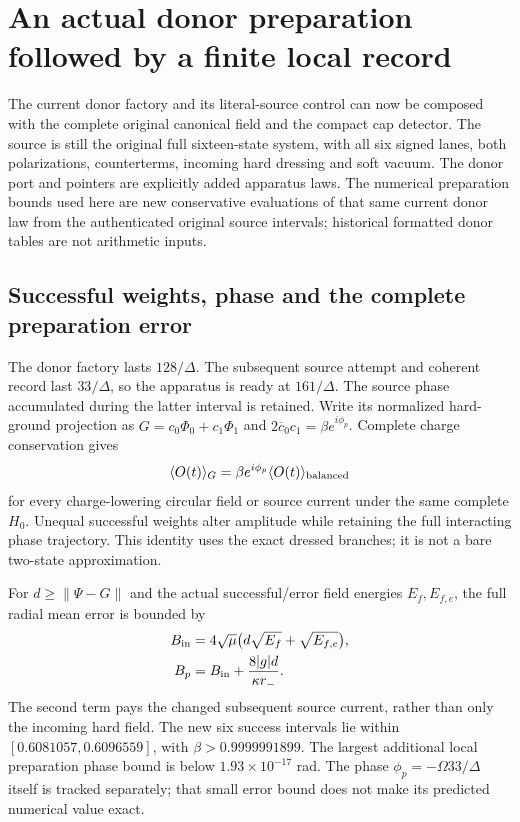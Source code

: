 \section{An actual donor preparation followed by a finite local record}

The current donor factory and its literal-source control can now be composed
with the complete original canonical field and the compact cap detector. The
source is still the original full sixteen-state system, with all six signed
lanes, both polarizations, counterterms, incoming hard dressing and soft vacuum.
The donor port and pointers are explicitly added apparatus laws. The numerical
preparation bounds used here are new conservative evaluations of that same
current donor law from the authenticated original source intervals; historical
formatted donor tables are not arithmetic inputs.

\subsection{Successful weights, phase and the complete preparation error}

The donor factory lasts $128/\Delta$. The subsequent source attempt and
coherent record last $33/\Delta$, so the apparatus is ready at $161/\Delta$.
The source phase accumulated during the latter interval is retained. Write its
normalized hard-ground projection as $G=c_0\Phi_0+c_1\Phi_1$ and
$2\overline c_0c_1=\beta e^{i\phi_p}$. Complete charge conservation gives
\begin{equation}
 \langle O(t)\rangle_G=\beta e^{i\phi_p}
                \langle O(t)\rangle_{\rm balanced}
 \label{eq:prep7charge}
\end{equation}
for every charge-lowering circular field or source current under the same
complete $H_0$. Unequal successful weights alter amplitude while retaining
the full interacting phase trajectory. This identity uses the exact dressed
branches; it is not a bare two-state approximation.

For $d\geq\|\Psi-G\|$ and the actual successful/error field energies
$E_f,E_{f,e}$, the full radial mean error is bounded by
\begin{align}
 B_{\rm in}&=4\sqrt\mu
              \bigl(d\sqrt{E_f}+\sqrt{E_{f,e}}\bigr),\\
 B_p&=B_{\rm in}+\frac{8|g|d}{\kappa r_-}.
\end{align}
The second term pays the changed subsequent source current, rather than only
the incoming hard field. The new six success intervals lie within
$[0.6081057,0.6096559]$, with $\beta>0.9999991899$.
The largest additional local preparation phase bound is below
$1.93\times10^{-17}$ rad. The phase $\phi_p=-\Omega33/\Delta$ itself is
tracked separately; that small error bound does not make its predicted
numerical value exact.

